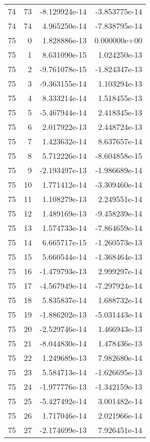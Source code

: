 \begin{tabular}{rrrr}
  74 &   73 & -8.129924e-14 & -3.853775e-14 \\
  74 &   74 &  4.965250e-14 & -7.838795e-14 \\
  75 &    0 &  1.828886e-13 &  0.000000e+00 \\
  75 &    1 &  8.631090e-15 &  1.024250e-13 \\
  75 &    2 & -9.761078e-15 & -1.824347e-13 \\
  75 &    3 & -9.363155e-14 &  1.103294e-13 \\
  75 &    4 &  8.333214e-14 &  1.518455e-13 \\
  75 &    5 & -5.467944e-14 &  2.418345e-13 \\
  75 &    6 &  2.017922e-13 &  2.448724e-13 \\
  75 &    7 &  1.423632e-14 &  8.637657e-14 \\
  75 &    8 &  5.712226e-14 & -8.604858e-15 \\
  75 &    9 & -2.193497e-13 & -1.986689e-14 \\
  75 &   10 &  1.771412e-14 & -3.309460e-14 \\
  75 &   11 &  1.108279e-13 &  2.249551e-14 \\
  75 &   12 &  1.489169e-13 & -9.458239e-14 \\
  75 &   13 &  1.574733e-14 & -7.864659e-14 \\
  75 &   14 &  6.665717e-15 & -1.260573e-13 \\
  75 &   15 &  5.660544e-14 & -1.368464e-13 \\
  75 &   16 & -1.479793e-13 &  2.999297e-14 \\
  75 &   17 & -4.567949e-14 & -7.297924e-14 \\
  75 &   18 &  5.835837e-14 &  1.688732e-14 \\
  75 &   19 & -1.886202e-13 & -5.031443e-14 \\
  75 &   20 & -2.529746e-14 &  1.466943e-13 \\
  75 &   21 & -8.044830e-14 &  1.478436e-13 \\
  75 &   22 &  1.249689e-13 &  7.982680e-14 \\
  75 &   23 &  5.584713e-14 & -1.626695e-13 \\
  75 &   24 & -1.977776e-13 & -1.342159e-13 \\
  75 &   25 & -5.427492e-14 &  3.001482e-14 \\
  75 &   26 &  1.717046e-14 &  2.021966e-14 \\
  75 &   27 & -2.174699e-13 &  7.926451e-14 \\

\end{tabular}
